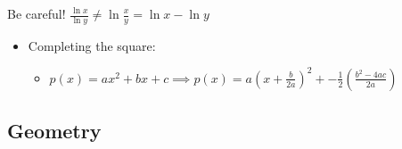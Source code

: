 Be careful! \(\frac{\ln x}{\ln y} \neq \ln\frac{x}{y} = \ln x - \ln y\)

\begin{itemize}
\tightlist
\item
  Completing the square:

  \begin{itemize}
  \tightlist
  \item
    \(p(x) = ax^2 + bx + c \implies p(x) = a(x+\frac{b}{2a})^2 + -\frac{1}{2}\left(\frac{b^2-4ac}{2a}\right)\)
  \end{itemize}
\end{itemize}

\hypertarget{geometry}{%
\subsection{Geometry}\label{geometry}}

